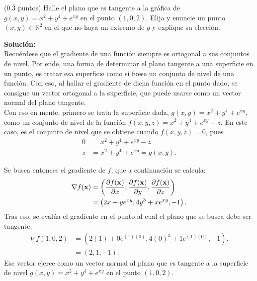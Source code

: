 \documentclass{fmbvecto}
\begin{document}
\phantom{} %

\begin{problema}
    
    (\(0.\bar{3}\) puntos) Halle el plano que es tangente a la gráfica de \(g(x, y) = x^2+y^4+e^{xy}\) en el punto \((1, 0, 2)\). Elija y enuncie un punto \((x, y) \in \mathbb{R}^2\) en el que no haya un extremo de \(g\) y explique su elección.

\vspace{1em}
\tcblower
\textbf{Solución:}\\

Recuérdese que el gradiente de una función siempre es ortogonal a sus conjuntos de nivel. Por ende, una forma de determinar el plano tangente a una superficie en un punto, es tratar esa superficie como si fuese un conjunto de nivel de una función. Con eso, al hallar el gradiente de dicha función en el punto dado, se consigue un vector ortogonal a la superficie, que puede usarse como un vector normal del plano tangente. \\

Con eso en mente, primero se trata la superficie dada, \(g(x, y) = x^2+y^4+e^{xy}\), como un conjunto de nivel de la función \(f(x, y, z) = x^2+y^4+e^{xy}-z\). En este caso, es el conjunto de nivel que se obtiene cuando \(f(x, y, z) = 0\), pues
\begin{align*}
    0 &= x^2+y^4+e^{xy}-z \\
    z &= x^2+y^4+e^{xy} = g(x, y).
\end{align*}
    
Se busca entonces el gradiente de \(f\), que a continuación se calcula:
\begin{align*}
    \nabla f(\bvec{x}) &= \left( \dparder[f(\bvec{x})][x], \dparder[f(\bvec{x})][y], \dparder[f(\bvec{x})][z] \right) \\
    &= \left( 2x+y e^{xy}, 4y^3+x e^{xy}, -1 \right).
\end{align*}
Tras eso, se evalúa el gradiente en el punto al cual el plano que se busca debe ser tangente:
\begin{align*}
    \nabla f(1, 0, 2) &= \left( 2(1)+0 e^{(1)(0)} , 4(0)^3+1 e^{(1)(0)}, -1 \right).\\
    &= \left( 2, 1, -1 \right).
\end{align*}
Ese vector ejerce como un vector normal al plano que es tangente a la superficie de nivel \(g(x, y) = x^2+y^4+e^{xy}\) en el punto \((1, 0, 2)\). \\


\end{problema}
\end{document}
